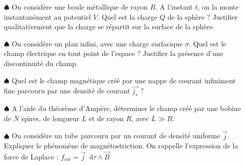 \documentclass{report}
\newcommand*\dif{\mathop{}\!\mathrm{d}}
\begin{document}
\begin{itemize}

	\item[$\spadesuit$] On considère une boule métallique de rayon $R$. A l'instant $t$, on la monte instantanément au potentiel $V$. Quel est la charge $Q$ de la sphère ? Justifier qualitativement que la charge se répartit sur la surface de la sphère.
	
	\item[$\spadesuit$] On considère un plan infini, avec une charge surfacique $\sigma$. Quel est le champ électrique en tout point de l'espace ? Justifier la présence d'une discontinuité du champ. 
	
	\item[$\spadesuit$] Quel est le champ magnétique créé par une nappe de courant infiniment fine parcouru par une densité de courant $\vec{j_s}$ ? 
	
	\item[$\spadesuit$] A l'aide du théorème d'Ampère, déterminer le champ créé par une bobine de $N$ spires, de longueur $L$ et de rayon $R$, avec $L\gg R$.
	
	\item[$\spadesuit$] On considère un tube parcouru par un courant de densité uniforme $\vec{j}$. Expliquer le phénomène de magnétostriction. On rappelle l'expression de la force de Laplace : $f_{vol}=\vec{j}\dif\tau\wedge\vec{B}$
	
\end{itemize}
\end{document}
